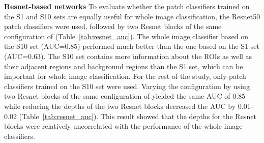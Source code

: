 \documentclass[12pt,letterpaper]{article}
\begin{document}
\textbf{Resnet-based networks}
\label{resnet_auc}
To evaluate whether the patch classifiers trained on the S1 and S10 sets are equally useful for whole image classification, the Resnet50 patch classifiers were used, followed by two Resnet blocks of the same configuration of  (Table~\ref{tab:resnet_auc}). The whole image classifier based on the S10 set (AUC=0.85) performed much better than the one based on the S1 set (AUC=0.63). The S10 set contains more information about the ROIs as well as their adjacent regions and background regions than the S1 set, which can be important for whole image classification. For the rest of the study, only patch classifiers trained on the S10 set were used. Varying the configuration by using two Resnet blocks of the same configuration of  yielded the same AUC of 0.85 while reducing the depths of the two Resnet blocks decreased the AUC by 0.01-0.02 (Table~\ref{tab:resnet_auc}). This result showed that the depths for the Resnet blocks were relatively uncorrelated with the performance of the whole image classifiers.
\end{document}
